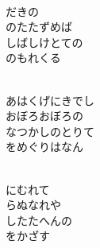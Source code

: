 \documentclass[10pt,b5j]{tarticle} %
\begin{document}
\vspace{1.5em} %
\newcommand{\linespace}{0.5em} %
\newcommand{\blocksize}{0.5\hsize} %
\newcommand{\itemmargin}{3em} %
\begin{enumerate} %
    \setlength{\itemindent}{\itemmargin} %
    \begin{minipage}[c]{\blocksize}
    
        \vspace{\linespace}
        \item~\\
        だきの\\
        のたたずめば\\
        しばしけとての\\
        のもれくる
        
    \end{minipage}
    \begin{minipage}[c]{\blocksize}
        
        \vspace{\linespace}
        \item~\\
        あはくげにきでし\\
        おぼろおぼろの\\
        なつかしのとりて\\
        をめぐりはなん
        
    \end{minipage}
    \begin{minipage}[c]{\blocksize}
        
        \vspace{\linespace}
        \item~\\
        にむれて\\
        らぬなれや\\
        したたへんの\\
        をかざす
        
    \end{minipage}
    \begin{minipage}[c]{\blocksize}
        

\end{minipage}
\end{enumerate}
\end{document}

